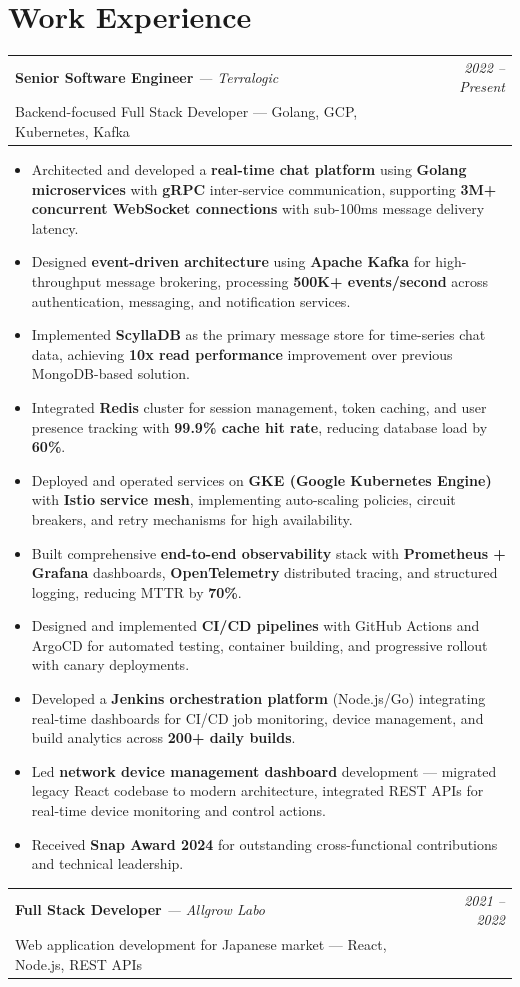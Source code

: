 \documentclass[a4paper,11pt]{article}
\newcommand{\resumeSubheading}[4]{
  \vspace{-1pt}
  \begin{tabularx}{\textwidth}{X r}
    \textbf{#1} \textit{\small --- #2} & \textit{\small #3} \\
    \small #4 & \\
  \end{tabularx}\vspace{-6pt}
}
\newcommand{\resumeItemListStart}{\begin{itemize}[leftmargin=0.2in, label=\textbullet, itemsep=1pt, parsep=0pt]}
\newcommand{\resumeItemListEnd}{\end{itemize}\vspace{-4pt}}
\newcommand{\resumeItem}[1]{\item\small{#1}}
\begin{document}
\section{Work Experience}

\resumeSubheading
  {Senior Software Engineer}{Terralogic}{2022 -- Present}
  {Backend-focused Full Stack Developer --- Golang, GCP, Kubernetes, Kafka}

\resumeItemListStart
  \resumeItem{Architected and developed a \textbf{real-time chat platform} using \textbf{Golang microservices} with \textbf{gRPC} inter-service communication, supporting \textbf{3M+ concurrent WebSocket connections} with sub-100ms message delivery latency.}
  \resumeItem{Designed \textbf{event-driven architecture} using \textbf{Apache Kafka} for high-throughput message brokering, processing \textbf{500K+ events/second} across authentication, messaging, and notification services.}
  \resumeItem{Implemented \textbf{ScyllaDB} as the primary message store for time-series chat data, achieving \textbf{10x read performance} improvement over previous MongoDB-based solution.}
  \resumeItem{Integrated \textbf{Redis} cluster for session management, token caching, and user presence tracking with \textbf{99.9\% cache hit rate}, reducing database load by \textbf{60\%}.}
  \resumeItem{Deployed and operated services on \textbf{GKE (Google Kubernetes Engine)} with \textbf{Istio service mesh}, implementing auto-scaling policies, circuit breakers, and retry mechanisms for high availability.}
  \resumeItem{Built comprehensive \textbf{end-to-end observability} stack with \textbf{Prometheus + Grafana} dashboards, \textbf{OpenTelemetry} distributed tracing, and structured logging, reducing MTTR by \textbf{70\%}.}
  \resumeItem{Designed and implemented \textbf{CI/CD pipelines} with GitHub Actions and ArgoCD for automated testing, container building, and progressive rollout with canary deployments.}
  \resumeItem{Developed a \textbf{Jenkins orchestration platform} (Node.js/Go) integrating real-time dashboards for CI/CD job monitoring, device management, and build analytics across \textbf{200+ daily builds}.}
  \resumeItem{Led \textbf{network device management dashboard} development --- migrated legacy React codebase to modern architecture, integrated REST APIs for real-time device monitoring and control actions.}
  \resumeItem{Received \textbf{Snap Award 2024} for outstanding cross-functional contributions and technical leadership.}
\resumeItemListEnd

\resumeSubheading
  {Full Stack Developer}{Allgrow Labo}{2021 -- 2022}
  {Web application development for Japanese market --- React, Node.js, REST APIs}
\end{document}
